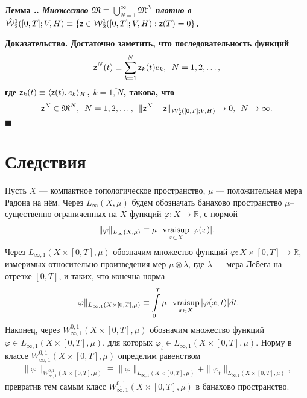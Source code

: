 \documentclass{report}
\newcounter{lem}[section]
\renewcommand{\thelem}{\thesection.\arabic{lem}}
\newenvironment{Lemma}{\par\refstepcounter{lem}\bf Лемма \thelem. \it}{\rm\par}
\newenvironment{Proof}{\par\noindent\bf Доказательство.\rm}{ $\blacksquare$\par}
\newcommand{\vraisup}{\mathop{\rm vraisup}}
\begin{document}
\begin{Lemma}\label{approx:w.abstract} Множество ${\mathfrak{M}}\equiv \bigcup\limits_{N=1}^\infty\mathfrak{M}^N$  плотно в 
$\hat{\mathcal{W}}{}^1_2([0,T];V,H)\equiv\{{\sf z}\in{\mathcal{W}}{}^1_2([0,T];V,H):{\sf z}(T)=0\}$.
\end{Lemma}
\begin{Proof}
Достаточно заметить, что последовательность функций 
$$
{\sf z}^N(t)\equiv\sum\limits_{k=1}^N{\sf z}_k(t)e_k,\,\,\,N=1,2,\dots,
$$ 
где ${\sf z}_k(t)\equiv\langle{\sf z}(t),e_k\rangle_H$, $k=\overline{1,N}$, такова, что 
\begin{gather*}
{\sf z}^N\in\mathfrak{M}^N,\,\,\,N=1,2,\dots,\,\,\,\|{\sf z}^N-{\sf z}\|_{\mathcal{W}{}^1_2([0,T];V,H)}\to0,\,\,\,N\to\infty.
\end{gather*}
\end{Proof}

        \section{Следствия}
Пусть $X$ --- компактное топологическое пространство, $\mu$ --- положительная мера Радона на нём. Через $L_\infty(X,\mu)$ будем обозначать банахово пространство $\mu$--существенно
ограниченных на $X$ функций $\varphi\colon X\to\mathbb{R}$, с нормой
\begin{gather*}
\|\varphi\|_{L_\infty(X,\mu)}\equiv\mu\text{--}\vraisup_{x\in X}|\varphi(x)|.
\end{gather*}
Через $L_{\infty,1}(X\times[0,T],\mu)$ обозначим множество функций $\varphi\colon X\times[0,T]\to\mathbb{R}$, измеримых относительно произведения мер $\mu\otimes\lambda$, где
$\lambda$ --- мера Лебега на отрезке $[0,T]$, и таких, что конечна норма
\begin{gather*}
\|\varphi\|_{L_{\infty,1}(X\times[0,T],\mu)}\equiv\int\limits_0^T\mu\text{--}\vraisup_{x\in X}|\varphi(x,t)|dt.
\end{gather*}
Наконец, через $W^{0,1}_{\infty,1}(X\times[0,T],\mu)$ обозначим множество функций $\varphi\in L_{\infty,1}(X\times[0,T],\mu)$, для которых
$\varphi_t\in L_{\infty,1}(X\times[0,T],\mu)$. Норму в классе $W^{0,1}_{\infty,1}(X\times[0,T],\mu)$ определим равенством
\begin{gather*}
\|\varphi\|_{W^{0,1}_{\infty,1}(X\times[0,T],\mu)}\equiv \|\varphi\|_{L_{\infty,1}(X\times[0,T],\mu)}+\|\varphi_t\|_{L_{\infty,1}(X\times[0,T],\mu)},
\end{gather*}
превратив тем самым класс $W^{0,1}_{\infty,1}(X\times[0,T],\mu)$ в банахово пространство.
\end{document}
